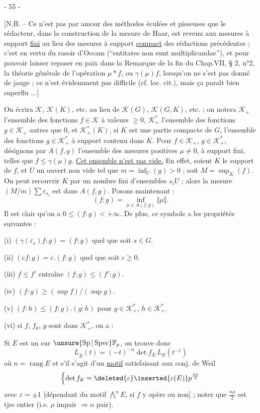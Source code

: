 
\begin{center}- 55 -\end{center}

[N.B. -- Ce n'est pas par amour des méthodes éculées et pisseuses que le rédacteur, dans la construction de la mesure de Haar, est revenu aux mesures à support \uline{fini} au lieu des mesures à support \uline{compact} des rédactions précédentes ; c'est en vertu du rasoir d'Occam (``entitates non sunt multiplicandae''), et pour pouvoir laisser reposer en paix dans la Remarque de la fin du Chap.VII, § 2, n°2, la théorie générale de l'opération $\mu*f$, ou $\gamma(\mu)f$, lorsqu'on ne s'est pas donné de jauge ; ce n'est évidemment pas difficile (cf. loc. cit.), mais ça paraît bien superflu $\ldots$]

On écrira $\mathcal{K}$, $\mathcal{K}(K)$, etc. au lieu de $\mathcal{K}(G)$, $\mathcal{K}(G,K)$, etc. ; on notera $\mathcal{K}_+$ l'ensemble des fonctions $f\in\mathcal{K}$ à valeurs $\geq0$, $\mathcal{K}^*_+$ l'ensemble des fonctions $g\in\mathcal{K}_+$ autres que $0$, et $\mathcal{K}^*_+(K)$, si $K$ est une partie compacte de $G$, l'ensemble des fonctions $g\in\mathcal{K}^*_+$ à support contenu dans $K$. Pour $f\in\mathcal{K}_+$, $g\in\mathcal{K}^*_+$, désignons par $A(f,g)$ l'ensemble des mesures positives $\mu\neq0$, à support fini, telles que $f\leq\gamma(\mu)g$. \uline{Cet ensemble n'est pas vide.} En effet, soient $K$ le support de $f$, et $U$ un ouvert non vide tel que $m=\inf_U(g)>0$ ; soit $M=\sup_K(f)$. On peut recouvrir $K$ par un nombre fini d'ensembles $s_iU$ ; alors la mesure $(M/m)\sum\varepsilon_{s_i}$ est dans $A(f,g)$. Posons maintenant :
\[
(f:g)=\inf_{\mu\in A(f,g)}\Vert\mu\Vert.
\]
Il est clair qu'on a $0\leq(f:g)<+\infty$. De plus, ce symbole a les propriétés suivantes :

(i) $(\gamma(\varepsilon_s)f:g)=(f:g)$ quel que soit $s\in G$.

(ii) $(cf:g)=c.(f:g)$ quel que soit $c\geq0$.

(iii) $f\leq f'$ entraîne $(f:g)\leq(f':g)$.

(iv) $(f:g)\geq(\sup f)/(\sup g)$.

(v) $(f:h)\leq(f:g).(g:h)$ pour $g\in\mathcal{K}^*_+$, $h\in\mathcal{K}^*_+$.

(vi) si $f$, $f_0$, $g$ sont dans $\mathcal{K}^*_+$, on a :

Si $E$ est un   sur $\unsure{\operatorname{Sp}|\operatorname{Spec}}\mathbb{F}_p$,  on trouve donc
\[
L_{\check E}(t)=(-t)^{-n}\det f_E\,L_E(t^{-1})
\]
où $n=\operatorname{rang}E$ et s'il s'agit d'un \uline{motif}  satisfaisant aux conj. de Weil
\[
\left\{\det f_E=\deleted{\varepsilon}\inserted{\varepsilon(E)}p^{\frac{n\rho}{2}}\right.
\]
avec $\varepsilon=\pm1$ [dépendant du motif $\bigwedge^n E$,  si $f$ y opère  ou non] ; noter que $\frac{n\rho}{2}$ est tjrs entier (i.e. $\rho$ impair $\Longrightarrow n$ pair).


